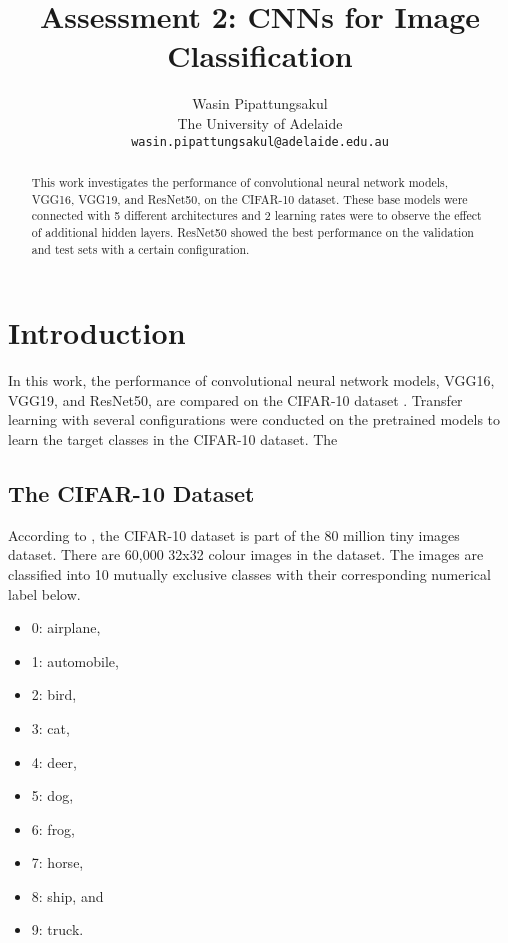 \documentclass[10pt,twocolumn,letterpaper]{article}
\begin{document}
\title{Assessment 2: CNNs for Image Classification}

\author{Wasin Pipattungsakul \\
The University of Adelaide \\
{\tt\small wasin.pipattungsakul@adelaide.edu.au}
}

\maketitle

\begin{abstract}
  This work investigates the performance of convolutional neural network models, VGG16, VGG19, and ResNet50, on
  the CIFAR-10 dataset. These base models were connected with 5 different architectures and 2 learning rates
  were to observe the effect of additional hidden layers. ResNet50 showed the best performance on the validation
  and test sets with a certain configuration.
\end{abstract}

\section{Introduction}

In this work, the performance of convolutional neural network models, VGG16, VGG19, and ResNet50, are compared
on the CIFAR-10 dataset \citep{data}. Transfer learning with several configurations were conducted on the
pretrained models to learn the target classes in the CIFAR-10 dataset. The

\subsection{The CIFAR-10 Dataset}

According to \citet{data}, the CIFAR-10 dataset is part of the 80 million tiny images dataset. There are 60,000
32x32 colour images in the dataset. The images are classified into 10 mutually exclusive classes with their
corresponding numerical label below.
\begin{itemize}
  \item 0: airplane,
  \item 1: automobile,
  \item 2: bird,
  \item 3: cat,
  \item 4: deer,
  \item 5: dog,
  \item 6: frog,
  \item 7: horse,
  \item 8: ship, and
  \item 9: truck.
\end{itemize}
\end{document}
